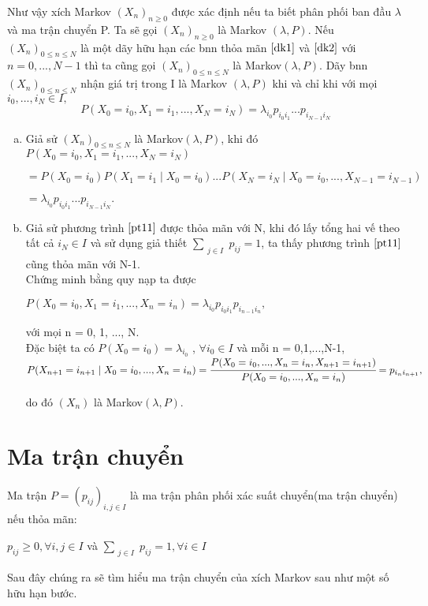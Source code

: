 Như vậy xích Markov $(X_n)_{n\geq0}$ được xác định nếu ta biết phân phối ban đầu $\lambda$ và ma trận chuyển P. Ta sẽ gọi $(X_n)_{n\geq 0}$ là Markov $(\lambda, P)$. Nếu $(X_n)_{0 \leq n \leq N}$ là một dãy hữu hạn các bnn thỏa mãn $\eqref{dk1}$ và $\eqref{dk2}$ với $n = 0,..., N-1$ thì ta cũng gọi $(X_n)_{0 \leq n \leq N}$ là Markov$(\lambda, P)$.
\hdn 
\dl\label{dl1.3} Dãy bnn $(X_n)_{0\leq n \leq N}$ nhận giá trị trong I là Markov $(\lambda, P)$ khi và chỉ khi với mọi $i_0,...,i_N \in I,$
\begin{equation}\label{pt11}
P(X_0 = i_0, X_1=i_1,...,X_N = i_N) = \lambda_{i_0}p_{i_0 i_1}...p_{i_{N-1} i_N}
\end{equation}
\cm 
\begin{enumerate}[a)]
\item Giả sử $(X_n)_{0\leq n \leq N}$ là Markov$(\lambda, P)$, khi đó\\
$P(X_0 = i_0, X_1=i_1,...,X_N=i_N)$

$=P(X_0=i_0)P(X_1=i_1 \mid X_0=i_0)...P(X_N=i_N \mid X_0=i_0,...,X_{N-1}=i_{N-1})$

$=\lambda_{i_0}p_{i_0 i_1}...p_{i_{N-1} i_N}.$
\item Giả sử phương trình $\eqref{pt11}$ được thỏa mãn với N, khi đó lấy tổng hai vế theo tất cả $i_N \in I$ và sử dụng giả thiết $\sum_{\substack{j \in I}} {p_{ij} } = 1$, ta thấy phương trình $\eqref{pt11}$ cũng thỏa mãn với N-1.\\
Chứng minh bằng quy nạp ta được
\begin{center}
$P(X_0=i_0, X_1=i_1,...,X_n=i_n) = \lambda_{i_0}p_{i_0 i_1}p_{i_{n-1}i_n},$
\end{center}
với mọi n = 0, 1, ..., N.\\
Đặc biệt ta có $P(X_0 = i_0)=\lambda_{i_0}$ , $\forall i_0 \in I$ và mỗi n = 0,1,...,N-1,\\
$P(X_{n+1}=i_{n+1}\mid X_0=i_0,...,X_n=i_n) \\ 
= \cfrac{P(X_0=i_0,...,X_n=i_n, X_{n+1}=i_{n+1})}{P(X_0=i_0,...,X_n=i_n)} = p_{i_n i_{n+1}},$

do đó $(X_n)$ là Markov$(\lambda, P).$
\end{enumerate}
\hdl
\section{Ma trận chuyển}
\dn
Ma trận $P=(p_{ij})_{i,j \in I}$ là ma trận phân phối xác suất chuyển(ma trận chuyển) nếu thỏa mãn:
\begin{center}
$p_{ij} \geq 0, \forall i, j \in I$ và $\sum_{\substack{j \in I}} {p_{ij} } = 1, \forall i \in I$
\end{center}
Sau đây chúng ra sẽ tìm hiểu ma trận chuyển của xích Markov sau như một số hữu hạn bước.

